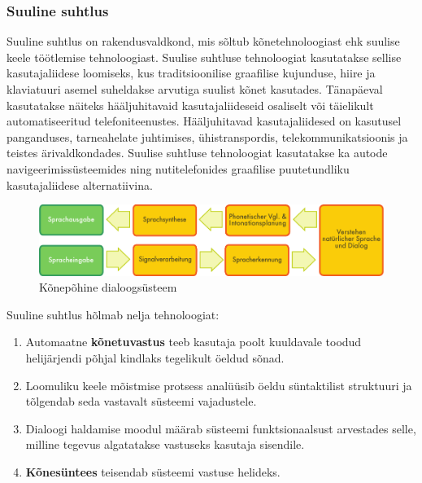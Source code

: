\begin{multicols}{2}
\subsubsection{Suuline suhtlus}

Suuline suhtlus on rakendusvaldkond, mis sõltub kõnetehnoloogiast ehk suulise keele töötlemise tehnoloogiast. 
Suulise suhtluse tehnoloogiat kasutatakse sellise kasutajaliidese loomiseks, kus traditsioonilise graafilise kujunduse, hiire ja klaviatuuri asemel suheldakse arvutiga suulist kõnet kasutades. 
Tänapäeval kasutatakse näiteks hääljuhitavaid kasutajaliideseid osaliselt või täielikult automatiseeritud telefoniteenustes. 
Hääljuhitavad kasutajaliidesed on kasutusel panganduses, tarneahelate juhtimises, ühistranspordis, telekommunikatsioonis ja teistes ärivaldkondades. 
Suulise suhtluse tehnoloogiat kasutatakse ka autode navigeerimissüsteemides ning nutitelefonides graafilise puutetundliku kasutajaliidese alternatiivina. 



\begin{figure}[htb]
  \center 
  \includegraphics[width=\textwidth]{../_media/german/simple_speech-based_dialogue_architecture}
  \caption{Kõnepõhine dialoogsüsteem}
  \label{fig:dialoguearch_ee}
\end{figure}


Suuline suhtlus hõlmab nelja tehnoloogiat:
   \begin{enumerate}
      \item Automaatne \textbf{kõnetuvastus} teeb kasutaja poolt kuuldavale toodud helijärjendi põhjal kindlaks tegelikult öeldud sõnad.
      \item Loomuliku keele mõistmise protsess ana\-lüüsib öeldu süntaktilist struk\-tuuri ja tõlgendab seda vastavalt süsteemi vajadustele.
      \item Dialoogi haldamise moodul määrab süsteemi funktsionaalsust arvestades selle, milline tegevus algatatakse vastuseks kasutaja sisendile. 
      \item \textbf{Kõnesüntees} teisendab süsteemi vastuse helideks.
    \end{enumerate}


\end{multicols}
